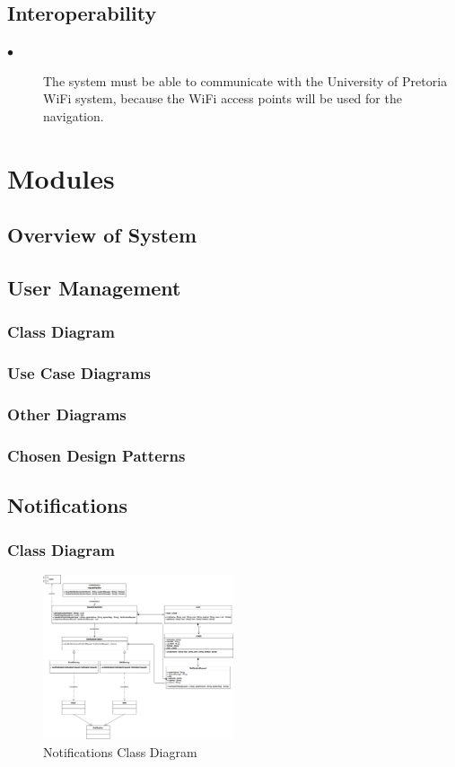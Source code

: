 \documentclass{article}
\begin{document}
    \subsection{Interoperability}
    
        \begin{description}
        
        \item[$\bullet$]The system must be able to communicate with the University of Pretoria WiFi system, because the WiFi  access points will be used for the navigation.
        
        \end{description}

\section{Modules}
	
	\subsection{Overview of System}
	
    \subsection{User Management}
        \subsubsection{Class Diagram}
        \subsubsection{Use Case Diagrams}
        \subsubsection{Other Diagrams}
        \subsubsection{Chosen Design Patterns}
    \subsection{Notifications}
        \subsubsection{Class Diagram}
		\begin{figure}
  			\caption{Notifications Class Diagram}
  			\centering
    			\includegraphics[width=0.5\textwidth]{Notifications_Class_Diagram}
		\end{figure}
\end{document}
